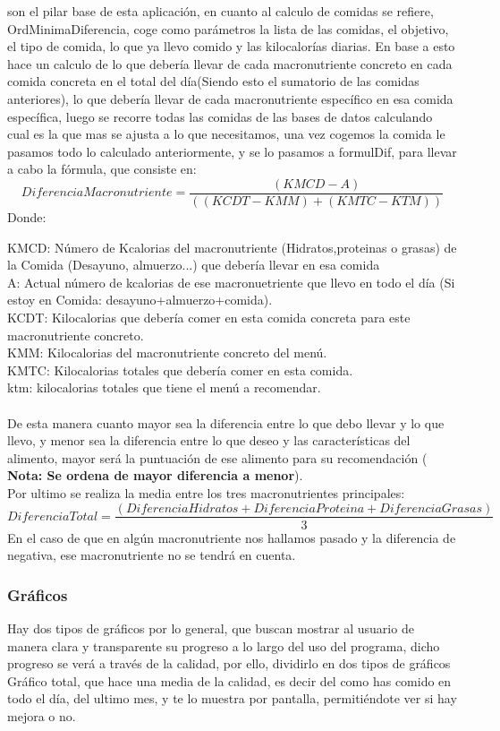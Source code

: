 son el pilar base de esta aplicación, en cuanto al calculo de comidas se refiere, OrdMinimaDiferencia, coge como parámetros la lista de las comidas, el objetivo, el tipo de comida, lo que ya llevo comido y las kilocalorías diarias. En base a esto hace un calculo de lo que debería llevar de cada macronutriente concreto en cada comida concreta en el total del día(Siendo esto el sumatorio de las comidas anteriores), lo que debería llevar de cada macronutriente específico en esa comida específica, luego se recorre todas las comidas de las bases de datos calculando cual es la que mas se ajusta a lo que necesitamos, una vez cogemos la comida le pasamos todo lo calculado anteriormente, y se lo pasamos a formulDif, para llevar a cabo la fórmula, que consiste en:
\begin{equation}
DiferenciaMacronutriente = \frac{(KMCD - A)}{((KCDT-KMM)+(KMTC-KTM))}
\end{equation}
Donde:

KMCD: Número de Kcalorias del macronutriente (Hidratos,proteinas o grasas) de la Comida (Desayuno, almuerzo...) que debería llevar en esa comida\\
A: Actual número de kcalorias de ese macronuetriente que llevo en todo el día (Si estoy en Comida: desayuno+almuerzo+comida).\\
KCDT: Kilocalorias que debería comer en esta comida concreta para este macronutriente concreto.\\
KMM: Kilocalorias del macronutriente concreto del menú.\\
KMTC: Kilocalorias totales que debería comer en esta comida.\\
ktm: kilocalorias totales que tiene el menú a recomendar.\\
\\
De esta manera cuanto mayor sea la diferencia entre lo que debo llevar y lo que llevo, y menor sea la diferencia entre lo que deseo y las características del alimento, mayor será la puntuación de ese alimento para su recomendación ( \textbf{Nota: Se ordena de mayor diferencia a menor}).\\
Por ultimo se realiza la media entre los tres macronutrientes principales:
\begin{equation}
DiferenciaTotal = \frac{(DiferenciaHidratos+DiferenciaProteina+DiferenciaGrasas)}{3}
\end{equation} 
En el caso de que en algún macronutriente nos hallamos pasado y la diferencia de negativa, ese macronutriente no se tendrá en cuenta.
\subsubsection{Gráficos}
Hay dos tipos de gráficos por lo general, que buscan mostrar al usuario de manera clara y transparente su progreso a lo largo del uso del programa, dicho progreso se verá a través de la calidad, por ello, dividirlo en dos tipos de gráficos
Gráfico total, que hace una media de la calidad, es decir del como has comido en todo el día, del ultimo mes, y te lo muestra por pantalla, permitiéndote ver si hay mejora o no.\\

